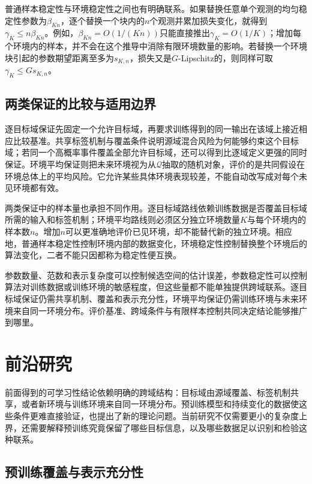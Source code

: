 普通样本稳定性与环境稳定性之间也有明确联系。如果替换任意单个观测的均匀稳定性参数为$\beta_{Kn}$，逐个替换一个块内的$n$个观测并累加损失变化，就得到
$\gamma_K\leq n\beta_{Kn}$。例如，$\beta_{Kn}=O(1/(Kn))$只能直接推出$\gamma_K=O(1/K)$；增加每个环境内的样本，并不会在这个推导中消除有限环境数量的影响。若替换一个环境块引起的参数期望距离至多为$s_{K,n}$，损失又是$G$-Lipschitz的，则同样可取$\gamma_K\leq Gs_{K,n}$。

\subsection{两类保证的比较与适用边界}
\label{sec:dg-guarantee-comparison}

逐目标域保证先固定一个允许目标域，再要求训练得到的同一输出在该域上接近相应比较基准。共享标签机制与覆盖条件说明源域混合风险为何能够约束这个目标域；若同一个高概率事件覆盖全部允许目标域，还可以得到比逐域定义更强的同时保证。环境平均保证则把未来环境视为从$\mathcal Q$抽取的随机对象，评价的是共同假设在环境总体上的平均风险。它允许某些具体环境表现较差，不能自动改写成对每个未见环境都有效。

两类保证中的样本量也承担不同作用。逐目标域路线依赖训练数据是否覆盖目标域所需的输入和标签机制；环境平均路线则必须区分独立环境数量$K$与每个环境内的样本数$n$。增加$n$可以更准确地评价已见环境，却不能替代新的独立环境。相应地，普通样本稳定性控制环境内部的数据变化，环境稳定性控制替换整个环境后的算法变化，二者不能只因都称为稳定性便互换。

参数数量、范数和表示复杂度可以控制候选空间的估计误差，参数稳定性可以控制算法对训练数据或训练环境的敏感程度，但这些量都不能单独提供跨域联系。逐目标域保证仍需共享机制、覆盖和表示充分性，环境平均保证仍需训练环境与未来环境来自同一环境分布。评价基准、跨域条件与有限样本控制共同决定结论能够推广到哪里。

\section{前沿研究}
\label{sec:transfer-frontiers}

前面得到的可学习性结论依赖明确的跨域结构：目标域由源域覆盖、标签机制共享，或者新环境与训练环境来自同一环境分布。预训练模型和持续变化的数据使这些条件更难直接验证，也提出了新的理论问题。当前研究不仅需要更小的复杂度上界，还需要解释预训练究竟保留了哪些目标信息，以及哪些数据足以识别和检验这种联系。

\subsection{预训练覆盖与表示充分性}
\label{sec:transfer-frontier-representation}

